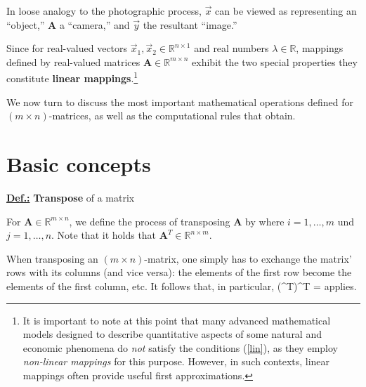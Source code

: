 \medskip
\noindent
In loose analogy to the photographic process, $\vec{x}$ can be 
viewed as representing an ``object,'' $\mathbf{A}$ a ``camera,'' 
and $\vec{y}$ the resultant ``image.''

\medskip
\noindent
Since for real-valued vectors $\vec{x}_{1},\vec{x}_{2} \in 
\mathbb{R}^{n \times 1}$ and real numbers $\lambda \in 
\mathbb{R}$, mappings defined by real-valued matrices $\mathbf{A} 
\in \mathbb{R}^{m \times n}$ exhibit the two special properties
%
\be
{}
\ee
%
they constitute {\bf linear mappings}.\footnote{It is important to 
note at this point that many advanced mathematical models designed 
to describe quantitative aspects of some natural and economic 
phenomena do \emph{not} satisfy the conditions (\ref{lin}), as 
they employ \emph{non-linear mappings} for this purpose. However, 
in such contexts, linear mappings often provide useful first 
approximations.}

\medskip
\noindent
We now turn to discuss the most important mathematical operations 
defined for $(m \times n)$-matrices, as well as the computational 
rules that obtain.

\section[Basic concepts]%
{Basic concepts}

\noindent
\underline{\bf Def.:}
{\bf Transpose} of a matrix

\noindent
For $\mathbf{A} \in \mathbb{R}^{m \times n}$, we define the 
process of transposing $\mathbf{A}$ by
%
\be
{}
\ee
%
where $i=1,\ldots,m$ und $j=1,\ldots,n$. Note that it holds that
$\mathbf{A}^{T} \in \mathbb{R}^{n \times m}$.

\medskip
\noindent
When transposing an $(m \times n)$-matrix, one simply has to 
exchange the matrix' rows with its columns (and vice versa): the 
elements of the first row become the elements of the first column, 
etc. It follows that, in particular,
%
\be
(^{T})^{T} = 
\ee
%
applies.

